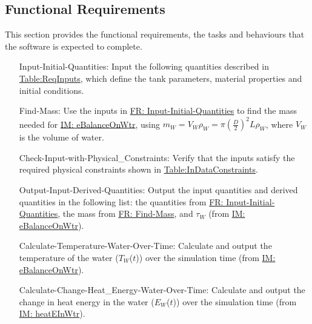 \documentclass[12pt]{article}
\begin{document}
\subsection{Functional Requirements}
\label{Sec:FRs}
This section provides the functional requirements, the tasks and behaviours that the software is expected to complete.
\begin{itemize}
\item[Input-Initial-Quantities:\phantomsection\label{inputInitQuants}]Input the following quantities described in \hyperref[Table:ReqInputs]{Table:ReqInputs}, which define the tank parameters, material properties and initial conditions.
\item[Find-Mass:\phantomsection\label{findMass}]Use the inputs in \hyperref[inputInitQuants]{FR: Input-Initial-Quantities} to find the mass needed for \hyperref[IM:eBalanceOnWtr]{IM: eBalanceOnWtr}, using ${m_{W}}={V_{W}} {ρ_{W}}=π \left(\frac{D}{2}\right)^{2} L {ρ_{W}}$, where ${V_{W}}$ is the volume of water.
\item[Check-Input-with-Physical\_Constraints:\phantomsection\label{checkWithPhysConsts}]Verify that the inputs satisfy the required physical constraints shown in \hyperref[Table:InDataConstraints]{Table:InDataConstraints}.
\item[Output-Input-Derived-Quantities:\phantomsection\label{outputInputDerivQuants}]Output the input quantities and derived quantities in the following list: the quantities from \hyperref[inputInitQuants]{FR: Input-Initial-Quantities}, the mass from \hyperref[findMass]{FR: Find-Mass}, and ${τ_{W}}$ (from \hyperref[IM:eBalanceOnWtr]{IM: eBalanceOnWtr}).
\item[Calculate-Temperature-Water-Over-Time:\phantomsection\label{calcTempWtrOverTime}]Calculate and output the temperature of the water (${T_{W}}$($t$)) over the simulation time (from \hyperref[IM:eBalanceOnWtr]{IM: eBalanceOnWtr}).
\item[Calculate-Change-Heat\_Energy-Water-Over-Time:\phantomsection\label{calcChgHeatEnergyWtrOverTime}]Calculate and output the change in heat energy in the water (${E_{W}}$($t$)) over the simulation time (from \hyperref[IM:heatEInWtr]{IM: heatEInWtr}).
\end{itemize}
\end{document}
